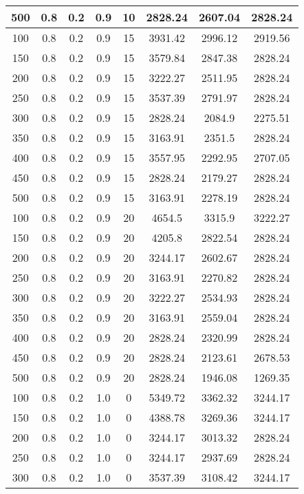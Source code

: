 \documentclass[a4paper, 12pt]{extreport}
\begin{document}
\begin{itemize}
\begin{longtable}{|c|c|c|c|c|c|c|c|}
			500 & 0.8 & 0.2 & 0.9 & 10 & 2828.24 & 2607.04 & 2828.24 \\\hline
			100 & 0.8 & 0.2 & 0.9 & 15 & 3931.42 & 2996.12 & 2919.56 \\\hline
			150 & 0.8 & 0.2 & 0.9 & 15 & 3579.84 & 2847.38 & 2828.24 \\\hline
			200 & 0.8 & 0.2 & 0.9 & 15 & 3222.27 & 2511.95 & 2828.24 \\\hline
			250 & 0.8 & 0.2 & 0.9 & 15 & 3537.39 & 2791.97 & 2828.24 \\\hline
			300 & 0.8 & 0.2 & 0.9 & 15 & 2828.24 & 2084.9 & 2275.51 \\\hline
			350 & 0.8 & 0.2 & 0.9 & 15 & 3163.91 & 2351.5 & 2828.24 \\\hline
			400 & 0.8 & 0.2 & 0.9 & 15 & 3557.95 & 2292.95 & 2707.05 \\\hline
			450 & 0.8 & 0.2 & 0.9 & 15 & 2828.24 & 2179.27 & 2828.24 \\\hline
			500 & 0.8 & 0.2 & 0.9 & 15 & 3163.91 & 2278.19 & 2828.24 \\\hline
			100 & 0.8 & 0.2 & 0.9 & 20 & 4654.5 & 3315.9 & 3222.27 \\\hline
			150 & 0.8 & 0.2 & 0.9 & 20 & 4205.8 & 2822.54 & 2828.24 \\\hline
			200 & 0.8 & 0.2 & 0.9 & 20 & 3244.17 & 2602.67 & 2828.24 \\\hline
			250 & 0.8 & 0.2 & 0.9 & 20 & 3163.91 & 2270.82 & 2828.24 \\\hline
			300 & 0.8 & 0.2 & 0.9 & 20 & 3222.27 & 2534.93 & 2828.24 \\\hline
			350 & 0.8 & 0.2 & 0.9 & 20 & 3163.91 & 2559.04 & 2828.24 \\\hline
			400 & 0.8 & 0.2 & 0.9 & 20 & 2828.24 & 2320.99 & 2828.24 \\\hline
			450 & 0.8 & 0.2 & 0.9 & 20 & 2828.24 & 2123.61 & 2678.53 \\\hline
			500 & 0.8 & 0.2 & 0.9 & 20 & 2828.24 & 1946.08 & 1269.35 \\\hline
			100 & 0.8 & 0.2 & 1.0 & 0 & 5349.72 & 3362.32 & 3244.17 \\\hline
			150 & 0.8 & 0.2 & 1.0 & 0 & 4388.78 & 3269.36 & 3244.17 \\\hline
			200 & 0.8 & 0.2 & 1.0 & 0 & 3244.17 & 3013.32 & 2828.24 \\\hline
			250 & 0.8 & 0.2 & 1.0 & 0 & 3244.17 & 2937.69 & 2828.24 \\\hline
			300 & 0.8 & 0.2 & 1.0 & 0 & 3537.39 & 3108.42 & 3244.17 \\\hline

\end{longtable}
\end{itemize}
\end{document}

